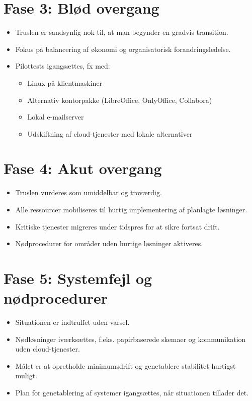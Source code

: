 \documentclass[a4paper,11pt,oneside]{book}
\def\tightlist{}
\begin{document}
\section{Fase 3: Blød overgang}\label{fase-3-bluxf8d-overgang}

\begin{itemize}
\item
  Truslen er sandsynlig nok til, at man begynder en gradvis transition.
\item
  Fokus på balancering af økonomi og organisatorisk forandringsledelse.
\item
  Pilottests igangsættes, fx med:

  \begin{itemize}
  \tightlist
  \item
    Linux på klientmaskiner
  \item
    Alternativ kontorpakke (LibreOffice, OnlyOffice, Collabora)
  \item
    Lokal e-mailserver
  \item
    Udskiftning af cloud-tjenester med lokale alternativer
  \end{itemize}
\end{itemize}

\section{Fase 4: Akut overgang}\label{fase-4-akut-overgang}

\begin{itemize}
\tightlist
\item
  Truslen vurderes som umiddelbar og troværdig.
\item
  Alle ressourcer mobiliseres til hurtig implementering af planlagte
  løsninger.
\item
  Kritiske tjenester migreres under tidspres for at sikre fortsat drift.
\item
  Nødprocedurer for områder uden hurtige løsninger aktiveres.
\end{itemize}

\section{Fase 5: Systemfejl og
nødprocedurer}\label{fase-5-systemfejl-og-nuxf8dprocedurer}

\begin{itemize}
\tightlist
\item
  Situationen er indtruffet uden varsel.
\item
  Nødløsninger iværksættes, f.eks. papirbaserede skemaer og
  kommunikation uden cloud-tjenester.
\item
  Målet er at opretholde minimumsdrift og genetablere stabilitet
  hurtigst muligt.
\item
  Plan for genetablering af systemer igangsættes, når situationen
  tillader det.
\end{itemize}
\end{document}
